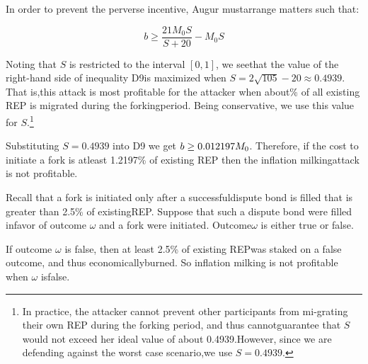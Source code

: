 \documentclass[12pt,floatfix,reprint,nofootinbib,amsmath,amssymb,epsfig,pre,floats,letterpaper,groupedaffiliation]{revtex4-1}
\theoremstyle{definition}
\theoremstyle{definition}
\begin{document}
In order to prevent the perverse incentive, Augur must\linebreak arrange matters such that:

\begin{equation}
b \geq \frac{21M_0S}{S + 20} - M_0S\tag{D9}
\end{equation}

Noting that $S$ is restricted to the interval $[0, 1]$, we see\linebreak that the value of the right-hand side of inequality D9\linebreak is maximized when $S = 2\sqrt{105} - 20 \approx 0.4939$. That is,\linebreak this attack is most profitable for the attacker when about\% of all existing REP is migrated during the forking\linebreak period. Being conservative, we use this value for $S$.\footnote{In practice, the attacker cannot prevent other participants from mi-\linebreak grating their own REP during the forking period, and thus cannot\linebreak guarantee that $S$ would not exceed her ideal value of about 0.4939.\linebreak However, since we are defending against the worst case scenario,\linebreak we use $S = 0.4939$.}

Substituting $S = 0.4939$ into D9 we get $b \geq\linebreak 0.012197M_0$. Therefore, if the cost to initiate a fork is at\linebreak least 1.2197\% of existing REP then the inflation milking\linebreak attack is not profitable.

Recall that a fork is initiated only after a successful\linebreak dispute bond is filled that is greater than 2.5\% of existing\linebreak REP. Suppose that such a dispute bond were filled in\linebreak favor of outcome $\omega$ and a fork were initiated. Outcome\linebreak $\omega$ is either true or false.

If outcome $\omega$ is false, then at least 2.5\% of existing REP\linebreak was staked on a false outcome, and thus economically\linebreak burned. So inflation milking is not profitable when $\omega$ is\linebreak false.
\end{document}
